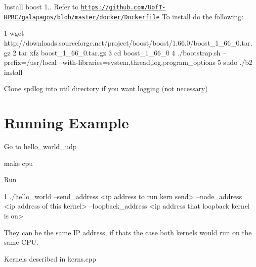 
\begin{DoxyEnumerate}
\item Install boost 1.. Refer to \href{https://github.com/UofT-HPRC/galapagos/blob/master/docker/Dockerfile}{\tt https\+://github.\+com/\+Uof\+T-\/\+H\+P\+R\+C/galapagos/blob/master/docker/\+Dockerfile} To install do the following\+: 
\begin{DoxyCode}
1 wget http://downloads.sourceforge.net/project/boost/boost/1.66.0/boost\_1\_66\_0.tar.gz
2 tar xfz boost\_1\_66\_0.tar.gz 
3 cd boost\_1\_66\_0 
4 ./bootstrap.sh --prefix=/usr/local  --with-libraries=system,thread,log,program\_options  
5 sudo ./b2 install 
\end{DoxyCode}

\item Clone spdlog into util directory if you want logging (not necessary)
\end{DoxyEnumerate}

\section*{Running Example}


\begin{DoxyEnumerate}
\item Go to hello\+\_\+world\+\_\+udp
\item {\ttfamily make cpu}
\item Run 
\begin{DoxyCode}
1 ./hello\_world --send\_address <ip address to run kern send> --node\_address <ip address of this kernel>
       --loopback\_address <ip address that loopback kernel is on>
\end{DoxyCode}
 They can be the same IP address, if thats the case both kernels would run on the same C\+PU.
\item Kernels described in kerns.\+cpp 
\end{DoxyEnumerate}